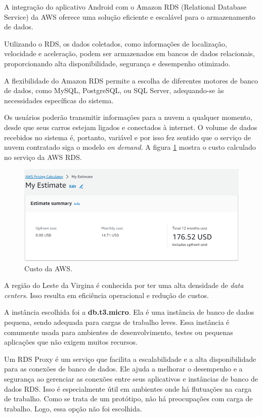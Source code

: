 A integração do aplicativo Android com o Amazon RDS (Relational Database Service) da AWS oferece uma solução eficiente e escalável para o armazenamento de dados. 

Utilizando o RDS, os dados coletados, como informações de localização, velocidade e aceleração, podem ser armazenados em bancos de dados relacionais, proporcionando alta disponibilidade, segurança e desempenho otimizado. 

A flexibilidade do Amazon RDS permite a escolha de diferentes motores de banco de dados, como MySQL, PostgreSQL, ou SQL Server, adequando-se às necessidades específicas do sistema.

Os usuários poderão transmitir informações para a nuvem a qualquer momento, desde que seus carros estejam ligados e conectados à internet. O volume de dados recebidos no sistema é, portanto, variável e por isso fez sentido que o serviço de nuvem contratado siga o modelo \textit{on demand}. A figura \ref{figure:custo_aws_inicial} mostra o custo calculado no serviço da AWS RDS.

\begin{figure}[hp]
    \centering
    
    \includegraphics[scale=0.8]{figures/custo_aws_inicial.PNG}
    \caption{Custo da AWS.}
    \label{figure:custo_aws_inicial}
    
\end{figure}

A região do Leste da Virgina é conhecida por ter uma alta densidade de \textit{data centers}. Isso resulta em eficiência operacional e redução de custos.

A instância escolhida foi a \textbf{db.t3.micro}. Ela é uma instância de banco de dados pequena, sendo adequada para cargas de trabalho leves. Essa instância é comumente usada para ambientes de desenvolvimento, testes ou pequenas aplicações que não exigem muitos recursos.

Um RDS Proxy é um serviço que facilita a escalabilidade e a alta disponibilidade para as conexões de banco de dados. Ele ajuda a melhorar o desempenho e a segurança ao gerenciar as conexões entre seus aplicativos e instâncias de banco de dados RDS. Isso é especialmente útil em ambientes onde há flutuações na carga de trabalho. Como se trata de um protótipo, não há preocupações com carga de trabalho. Logo, essa opção não foi escolhida.

